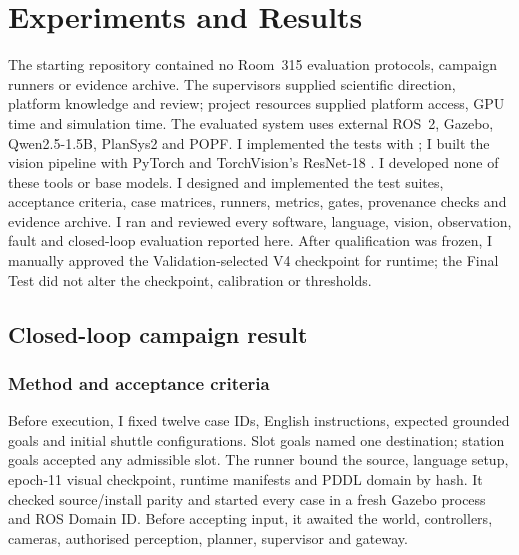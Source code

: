 \chapter{Experiments and Results}
\label{chap:results}


\contributionboundary
  {The starting repository contained no Room~315 evaluation protocols, campaign
  runners or evidence archive.}
  {The supervisors supplied scientific direction, platform knowledge and
  review; project resources supplied platform access, GPU time and simulation
  time.}
  {The evaluated system uses external ROS~2, Gazebo, Qwen2.5-1.5B, PlanSys2 and
  POPF. I implemented the tests with  \citep{pytest}; I built the
  vision pipeline with PyTorch \citep{pytorch} and TorchVision's ResNet-18
  \citep{torchvisionresnet18,resnet}. I developed none of these tools or base
  models.}
  {I designed and implemented the test suites, acceptance criteria, case
  matrices, runners, metrics, gates, provenance checks and evidence archive.}
  {I ran and reviewed every software, language, vision, observation, fault and
  closed-loop evaluation reported here. After qualification was frozen, I
  manually approved the Validation-selected V4 checkpoint for runtime; the
  Final Test did not alter the checkpoint, calibration or thresholds.}

\section{Closed-loop campaign result}
\label{sec:v4-closed-loop-campaign}

\subsection{Method and acceptance criteria}

Before execution, I fixed twelve case IDs, English instructions, expected
grounded goals and initial shuttle configurations. Slot goals named one
destination; station goals accepted any admissible slot. The runner bound the
source, language setup, epoch-11 visual checkpoint, runtime manifests and PDDL
domain by hash. It checked source/install parity and started every case in a
fresh Gazebo process and ROS Domain ID. Before accepting input, it awaited the
world, controllers, cameras, authorised perception, planner, supervisor and
gateway.

